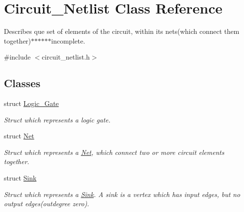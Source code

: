 \hypertarget{classCircuit__Netlist}{\section{Circuit\-\_\-\-Netlist Class Reference}
\label{classCircuit__Netlist}
}


Describes que set of elements of the circuit, within its nets(which connect them together)$\ast$$\ast$$\ast$$\ast$$\ast$$\ast$incomplete.  




{\ttfamily \#include $<$circuit\-\_\-netlist.\-h$>$}

\subsection*{Classes}
\begin{DoxyCompactItemize}
\item 
struct \hyperlink{structCircuit__Netlist_1_1Logic__Gate}{Logic\-\_\-\-Gate}
\begin{DoxyCompactList}\small\item\em Struct which represents a logic gate. \end{DoxyCompactList}\item 
struct \hyperlink{structCircuit__Netlist_1_1Net}{Net}
\begin{DoxyCompactList}\small\item\em Struct which represents a \hyperlink{structCircuit__Netlist_1_1Net}{Net}, which connect two or more circuit elements together. \end{DoxyCompactList}\item 
struct \hyperlink{structCircuit__Netlist_1_1Sink}{Sink}
\begin{DoxyCompactList}\small\item\em Struct which represents a \hyperlink{structCircuit__Netlist_1_1Sink}{Sink}. A sink is a vertex which has input edges, but no output edges(outdegree zero). \end{DoxyCompactList}\end{DoxyCompactItemize}
